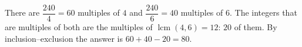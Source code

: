 There are $\dfrac{240}{4}=60$ multiples of $4$ and $\dfrac{240}{6}=40$ multiples of $6$. The integers that are multiples of both are the multiples of $\operatorname{lcm}(4,6)=12$: $20$ of them. By inclusion--exclusion the answer is $60+40-20=\boxed{80}$.
